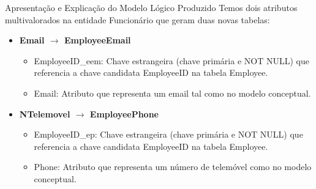 \documentclass[compress,svgnames,handout,13.7pt]{beamer}
\begin{document}
\begin{frame}{Apresentação e Explicação do Modelo Lógico Produzido}
            Temos dois atributos multivalorados na entidade Funcionário que geram duas novas tabelas:
            \begin{itemize}
                \item{\textbf{Email $\rightarrow$ EmployeeEmail}}
                    \begin{itemize}
                        \item{EmployeeID\_eem:} Chave estrangeira (chave primária e NOT NULL) que referencia a chave candidata EmployeeID na tabela Employee.
                        \item{Email:} Atributo que representa um email tal como no modelo conceptual.
                    \end{itemize}
                \item{\textbf{NTelemovel $\rightarrow$ EmployeePhone}}
                    \begin{itemize}
                        \item{EmployeeID\_ep:} Chave estrangeira (chave primária e NOT NULL) que referencia a chave candidata EmployeeID na tabela Employee.
                        \item{Phone:} Atributo que representa um número de telemóvel como no modelo conceptual.
                    \end{itemize}
            \end{itemize}
\end{frame}
\end{document}
